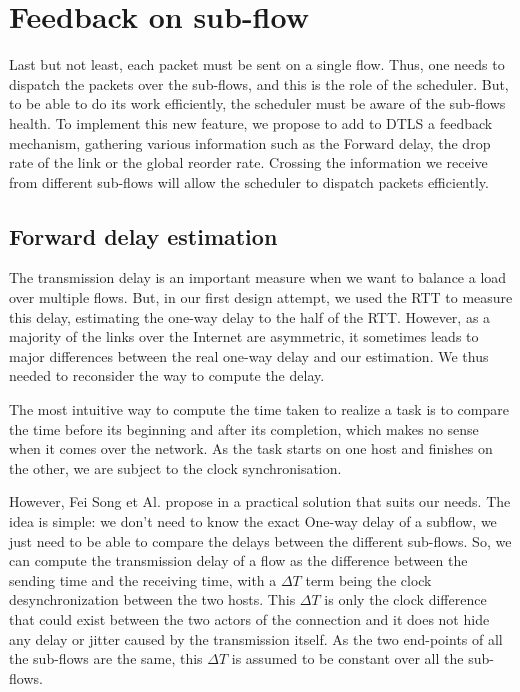 \section{Feedback on sub-flow}
\label{sec:mpdtls-feedback}

Last but not least, each packet must be sent on a single flow. Thus, one needs to dispatch the packets over the sub-flows, and this is the role of the scheduler. But, to be able to do its work efficiently, the scheduler must be aware of the sub-flows health. To implement this new feature, we propose to add to DTLS a feedback mechanism, gathering various information such as the Forward delay, the drop rate of the link or the global reorder rate. Crossing the information we receive from different sub-flows will allow the scheduler to dispatch packets efficiently.

\subsection{Forward delay estimation}
\label{sec:forward-delay}
The transmission delay is an important measure when we want to balance a load over multiple flows. But, in our first design attempt, we used the RTT to measure this delay, estimating the one-way delay to the half of the RTT. However, as a majority of the links over the Internet are asymmetric, it sometimes leads to major differences between the real one-way delay and our estimation. We thus needed to reconsider the way to compute the delay.

The most intuitive way to compute the time taken to realize a task is to compare the time before its beginning and after its completion, which makes no sense when it comes over the network. As the task starts on one host and finishes on the other, we are subject to the clock synchronisation.

However, Fei Song et Al. propose in \cite{song2009estimator} a practical solution that suits our needs. The idea is simple: we don't need to know the exact One-way delay of a subflow, we just need to be able to compare the delays between the different sub-flows. So, we can compute the transmission delay of a flow as the difference between the sending time and the receiving time, with a $\Delta T$ term being the clock desynchronization between the two hosts. This $\Delta T$ is only the clock difference that could exist between the two actors of the connection and it does not hide any delay or jitter caused by the transmission itself. As the two end-points of all the sub-flows are the same, this $\Delta T$ is assumed to be constant over all the sub-flows.

